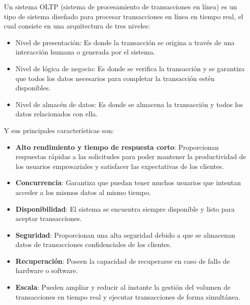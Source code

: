 \documentclass[12pt]{article}
\begin{document}
\begin{enumerate}[a.]
Un sistema OLTP (sistema de procesamiento de transacciones en línea) es un tipo de sistema diseñado para procesar transacciones en línea en tiempo real, el cual consiste en una arquitectura de tres niveles:
\begin{itemize}
    \item Nivel de presentación: Es donde la transacción se origina a través de una interacción humana o generada por el sistema.
    
    \item Nivel de lógica de negocio: Es donde se verifica  la transacción y se garantiza que todos los datos necesarios para completar la transacción estén disponibles.

    \item Nivel de almacén de datos: Es donde se almacena la transacción y todos los datos relacionados con ella.
    
\end{itemize}

Y sus principales características son:
\begin{itemize}
    \item \textbf{Alto rendimiento y tiempo de respuesta corto}: Proporcionan respuestas rápidas a las solicitudes para poder mantener la productividad de los usuarios empresariales y satisfacer las expectativas de los clientes.
    
    \item \textbf{Concurrencia}: Garantiza que puedan tener muchos usuarios que intentan acceder a los mismos datos al mismo tiempo.

   \item \textbf{Disponibilidad}: El sistema se encuentra siempre disponible y listo para aceptar transacciones.

   \item \textbf{Seguridad}: Proporcionan una alta seguridad debido a que se almacenan datos de transacciones confidenciales de los clientes.

   \item \textbf{Recuperación}: Poseen la capacidad de recuperarse en caso de fallo de hardware o software.

   \item \textbf{Escala}: Pueden ampliar y reducir al instante la gestión del volumen de transacciones en tiempo real y ejecutar transacciones de forma simultánea.

    
\end{itemize}




\end{enumerate}
\end{document}
